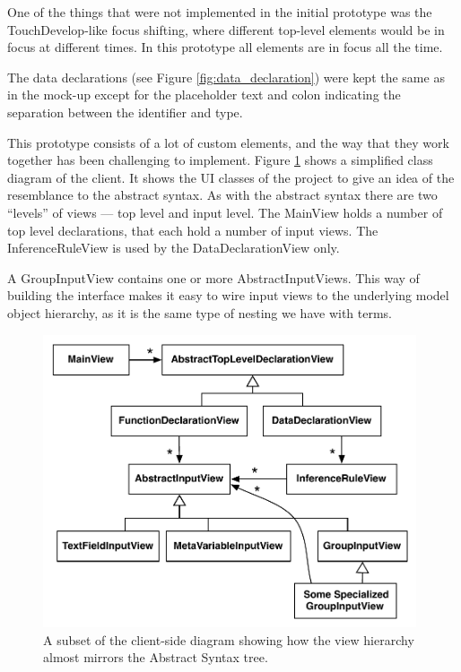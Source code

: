 One of the things that were not implemented in the initial prototype was the
TouchDevelop-like focus shifting, where different top-level elements would be
in focus at different times. In this prototype all elements are in focus all
the time.

The data declarations (see Figure \ref{fig:data_declaration}) were kept the same as in the mock-up except for the
placeholder text and colon indicating the separation between the identifier and
type.

This prototype consists of a lot of custom elements, and the way that they work
together has been challenging to implement. Figure \ref{fig:clientViewArchitecture} shows a simplified class diagram of the
client. It shows the UI classes of the project to give an idea of
the resemblance to the abstract syntax. As with the abstract syntax there are
two ``levels'' of views --- top level and input level. The MainView holds a
number of top level declarations, that each hold a number of input views. The
InferenceRuleView is used by the DataDeclarationView only.

A GroupInputView contains one or more AbstractInputViews. This way of building
the interface makes it easy to wire input views to the underlying model object
hierarchy, as it is the same type of nesting we have with terms. 

\begin{figure}
	\centering
		\includegraphics[width=110mm]{diagrams/client_side_class_diagram.pdf}
	\caption{A subset of the client-side diagram showing how the view hierarchy
	almost mirrors the Abstract Syntax tree.}
	\label{fig:clientViewArchitecture}
\end{figure}

